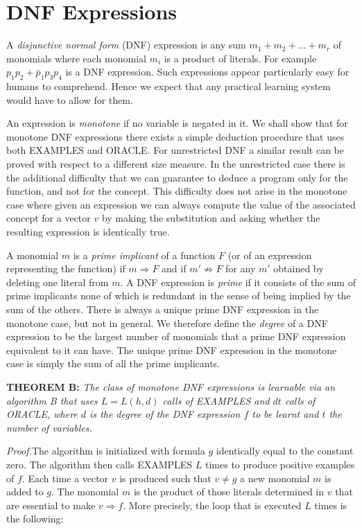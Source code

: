 \section{DNF Expressions}

A \emph{disjunctive normal form} (DNF) expression is
any sum $m_1 + m_2 + \ldots + m_r$ of monomials where each
monomial $m_i$ is a product of literals. For example
$p_1 p_2 + \bar{p}_1 p_3 p_4$ is a DNF expression. Such expressions appear particularly easy for humans to
comprehend. Hence we expect that any practical
learning system would have to allow for them.

An expression is \emph{monotone} if no variable is
negated in it. We shall show that for monotone DNF
expressions there exists a simple deduction procedure that uses both EXAMPLES and ORACLE. For
unrestricted DNF a similar result can be proved
with respect to a different size measure. In the
unrestricted case there is the additional difficulty
that we can guarantee to deduce a program only for
the function, and not for the concept. This difficulty does not arise in the monotone case where
given an expression we can always compute the value
of the associated concept for a vector $v$ by
making the substitution and asking whether the resulting expression is identically true.

A monomial $m$ is a \emph{prime implicant} of a function $F$ (or of an expression representing the
function) if $m \Rightarrow F$ and if $m' \not\Rightarrow F$ for any $m'$
obtained by deleting one literal from $m$. A DNF
expression is \emph{prime} if it consists of the sum of
prime implicants none of which is redundant in the
sense of being implied by the sum of the others.
There is always a unique prime DNF expression in
the monotone case, but not in general. We therefore define the \emph{degree} of a DNF expression to be
the largest number of monomials that a prime DNF
expression equivalent to it can have. The unique
prime DNF expression in the monotone case is simply
the sum of all the prime implicants.

\medskip
\noindent\textbf{THEOREM B:} \emph{The class of monotone DNF expressions
is learnable via an algorithm B that uses
$L = L(h,d)$ calls of EXAMPLES and \; $dt$ calls of
ORACLE, where $d$ is the degree of the DNF expression $f$ to be learnt and $t$ the number of
variables.}

\medskip
\noindent\textit{Proof.}\quad The algorithm is initialized with formula
$g$ identically equal to the constant zero. The
algorithm then calls EXAMPLES $L$ times to produce
positive examples of $f$. Each time a vector $v$
is produced such that $v \neq g$ a new monomial $m$
is added to $g$. The monomial $m$ is the product
of those literals determined in $v$ that are
essential to make $v \Rightarrow f$. More precisely, the loop
that is executed $L$ times is the following:

